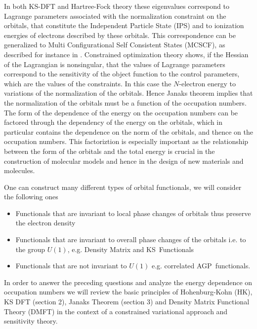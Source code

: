 \documentclass[aps,preprint]{revtex4}%
\begin{document}
In both KS-DFT and Hartree-Fock theory these eigenvalues correspond to
Lagrange parameters associated with the normalization constraint on the
orbitals, that constitute the Independent Particle State (IPS) and to
ionization energies of electrons described by these orbitals. This
correspondence can be generalized to Multi Configurational Self Consistent
States (MCSCF), as described for instance in \cite{WeinerOrtiz05}. Constrained
optimization theory \cite{Hestenes} shows, if the Hessian of the Lagrangian is
nonsingular, that the values of Lagrange parameters correspond to the
sensitivity of the object function to the control parameters, which are the
values of the constraints. In this case the $N$-electron energy to variations
of the normalization of the orbitals. Hence Janaks theorem implies that the
normalization of the orbitals must be a function of the occupation numbers.
The form of the dependence of the energy on the occupation numbers can be
factored through the dependency of the energy on the orbitals, which in
particular contains the dependence on the norm of the orbitals, and thence on
the occupation numbers. This factoriztion is especially important as the
relationship between the form of the orbitals and the total energy is crucial
in the construction of molecular models and hence in the design of new
materials and molecules.

One can construct many different types of orbital functionals, we will
consider the following ones

\begin{itemize}
\item Functionals that are invariant to local phase changes of orbitals thus
preserve the electron density

\item Functionals that are invariant to overall phase changes of the orbitals
i.e. to the group $U\left(  1\right)  $, e.g. Density Matrix and KS\ Functionals

\item Functionals that are not invariant to $U\left(  1\right)  $ e.g.
correlated AGP\ functionals.
\end{itemize}

In order to answer the preceding questions and analyze the energy dependence
on occupation numbers we will review the basic principles of Hohenburg-Kohn
(HK), KS DFT (section 2), Janaks Theorem (section 3) and Density Matrix
Functional Theory (DMFT) in the context of a constrained variational approach
and sensitivity theory. 
\end{document}
